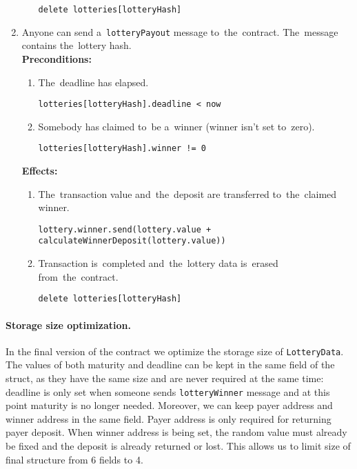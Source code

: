 \documentclass[a4paper]{article}
\begin{document}
\begin{enumerate}
\begin{enumerate}
\begin{center}
                        \texttt{delete lotteries[lotteryHash]}
                    \end{center}
            \end{enumerate}
        \item Anyone can send a~\texttt{lotteryPayout} message to~the~contract. The~message contains the~lottery hash.\\
            \textbf{Preconditions:}
            \begin{enumerate}
                \item The~deadline has elapsed.
                    \begin{center}
		                \texttt{lotteries[lotteryHash].deadline < now}
		            \end{center}
                \item Somebody has claimed to~be a~winner (winner isn't set to~zero).
                    \begin{center}
                        \texttt{lotteries[lotteryHash].winner != 0}
                    \end{center}
            \end{enumerate}
            \textbf{Effects:}
            \begin{enumerate}
                \item The~transaction value and~the~deposit are transferred to~the~claimed winner.
                    \begin{center}
			            \texttt{lottery.winner.send(lottery.value + calculateWinnerDeposit(lottery.value))}
			        \end{center}
                \item Transaction is~completed and~the~lottery data is~erased from~the~contract.
                    \begin{center}
                        \texttt{delete lotteries[lotteryHash]}
                    \end{center}
           \end{enumerate}
    \end{enumerate}

    \paragraph{Storage size optimization.}
    In the final version of the contract we optimize the storage size
    of \verb!LotteryData!. The values of both maturity and deadline
    can be kept in the same field of the struct, as they have the same
    size and are never required at the same time: deadline is only set
    when someone sends \verb!lotteryWinner! message and at this point
    maturity is no longer needed.
    Moreover, we can keep payer address and winner address in the same
    field. Payer address is only required for returning payer
    deposit. When winner address is being set, the random value must
    already be fixed and the deposit is already returned or lost. This
    allows us to limit size of final structure from 6 fields to 4.
    
\end{document}
